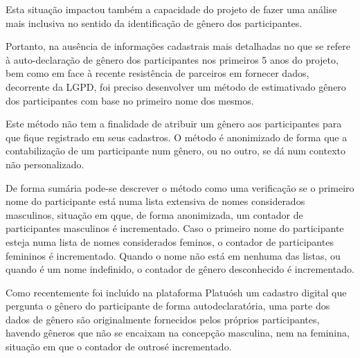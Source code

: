 \documentclass[
12pt,		%
openright,	%
twoside,  %
a4paper,			%
chapter=TITLE,		%
english,			%
french,				%
spanish,			%
brazil				%
]{USPSC-classe/USPSC_RedarTex}
\begin{document}
Esta situa\c{c}\~ao impactou tamb\'em a capacidade do projeto de fazer uma an\'alise mais inclusiva no sentido da identifica\c{c}\~ao de g\^enero dos participantes.










Portanto, na aus\^encia de informa\c{c}\~oes cadastrais mais detalhadas no que se refere \`a auto-declara\c{c}\~ao de g\^enero dos participantes nos primeiros 5 anos do projeto, bem como em face \`a recente resist\^encia de parceiros em fornecer dados, decorrente da LGPD, foi preciso desenvolver um m\'etodo de \textquotedbl estimativa\textquotedbl  do g\^enero dos participantes com base no primeiro nome dos mesmos.










Este m\'etodo n\~ao tem a finalidade de atribuir um g\^enero aos participantes para que fique registrado em seus cadastros. O m\'etodo \'e anonimizado de forma que a contabiliza\c{c}\~ao de um participante num g\^enero, ou no outro, se d\'a num contexto n\~ao personalizado.










De forma sum\'aria pode-se descrever o m\'etodo como uma verifica\c{c}\~ao se o primeiro nome do participante est\'a numa lista extensiva de nomes \textquotedbl considerados masculinos\textquotedbl , situa\c{c}\~ao em qque, de forma anonimizada, um contador de participantes masculinos \'e incrementado. Caso o primeiro nome do participante esteja numa lista de nomes \textquotedbl considerados feminos\textquotedbl , o contador de participantes femininos \'e incrementado. Quando o nome n\~ao est\'a em nenhuma das listas, ou quando \'e um nome indefinido, o contador de \textquotedbl g\^enero desconhecido \'e incrementado\textquotedbl .










Como recentemente foi inclu\'{\i}do na plataforma Platu\'osh um cadastro digital que pergunta o g\^enero do participante de forma autodeclarat\'oria, uma parte dos dados de g\^enero s\~ao originalmente fornecidos pelos pr\'oprios participantes, havendo g\^eneros que n\~ao se encaixam na concep\c{c}\~ao \textquotedbl masculina\textquotedbl , nem na \textquotedbl feminina\textquotedbl , situa\c{c}\~ao em que o contador de \textquotedbl outros\textquotedbl  \'e incrementado.
\end{document}
